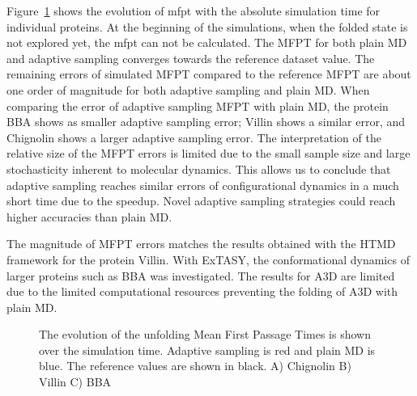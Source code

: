 Figure~\ref{fig:mfpt} shows the evolution of mfpt with the absolute simulation time for individual proteins. At the beginning of the simulations, when the folded state is not explored yet, the mfpt can not be calculated. The MFPT for both plain MD and adaptive sampling converges towards the reference dataset value. The remaining errors of simulated MFPT compared to the reference MFPT are about one order of magnitude for both adaptive sampling and plain MD. When comparing the error of adaptive sampling MFPT with plain MD, the protein BBA shows as smaller adaptive sampling error; Villin shows a similar error, and Chignolin shows a larger adaptive sampling error. The interpretation of the relative size of the MFPT errors is limited due to the small sample size and large stochasticity inherent to molecular dynamics. This allows us to conclude that adaptive sampling reaches similar errors of configurational dynamics in a much short time due to the speedup. Novel adaptive sampling strategies could reach higher accuracies than plain MD. 


The magnitude of MFPT errors matches the results obtained with the HTMD framework \cite{doerr2016htmd} for the protein Villin. With ExTASY, the conformational dynamics of larger proteins such as BBA was investigated. The results for A3D are limited due to the limited computational resources preventing the folding of A3D with plain MD.  
\begin{figure}[H]
\centering
   \begin{subfigure}[b]{0.5\linewidth}
   {}
   \end{subfigure}%
   
   \begin{subfigure}[b]{0.5\linewidth}
   {}
   \end{subfigure}%
   
   \begin{subfigure}[b]{0.5\linewidth}
   {}
    \end{subfigure}%
  \caption{
  The evolution of the unfolding Mean First Passage Times is shown over the simulation time. Adaptive sampling is red and plain MD is blue. The reference values are shown in black.
  A) Chignolin B) Villin C) BBA } 
  \label{fig:mfpt}
\end{figure}



